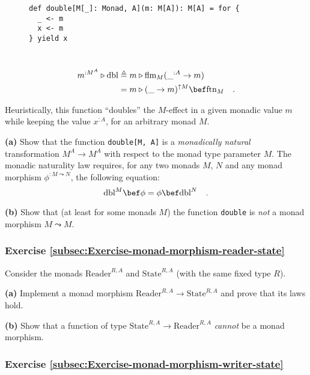 \begin{wrapfigure}{l}{0.52\columnwidth}%
\vspace{-0.7\baselineskip}
\begin{lstlisting}
def double[M[_]: Monad, A](m: M[A]): M[A] = for {
  _ <- m
  x <- m
} yield x
\end{lstlisting}

\vspace{-1.5\baselineskip}
\end{wrapfigure}%

~\vspace{-0.45\baselineskip}
\begin{align*}
m^{:M^{A}}\triangleright\text{dbl} & \triangleq m\triangleright\text{flm}_{M}(\_^{:A}\rightarrow m)\\
 & =m\triangleright(\_\rightarrow m)^{\uparrow M}\bef\text{ftn}_{M}\quad.
\end{align*}

Heuristically, this function \textsf{``}doubles\textsf{''} the $M$-effect in a given
monadic value $m$ while keeping the value $x^{:A}$, for an arbitrary
monad $M$. 

\textbf{(a)} Show that the function \lstinline!double[M, A]! is a
\emph{monadically natural} transformation $M^{A}\rightarrow M^{A}$
with respect to the monad type parameter $M$. The monadic naturality
law requires, for any two monads $M$, $N$ and any monad morphism
$\phi^{:M\leadsto N}$, the following equation:
\[
\text{dbl}^{M}\bef\phi=\phi\bef\text{dbl}^{N}\quad.
\]

\textbf{(b)} Show that (at least for some monads $M$) the function
\lstinline!double! is \emph{not} a monad morphism $M\leadsto M$. 

\subsubsection{Exercise \label{subsec:Exercise-monad-morphism-reader-state}\ref{subsec:Exercise-monad-morphism-reader-state}}

Consider the monads $\text{Reader}^{R,A}$ and $\text{State}^{R,A}$
(with the same fixed type $R$). 

\textbf{(a)} Implement a monad morphism $\text{Reader}^{R,A}\rightarrow\text{State}^{R,A}$
and prove that its laws hold.

\textbf{(b)} Show that a function of type $\text{State}^{R,A}\rightarrow\text{Reader}^{R,A}$
\emph{cannot} be a monad morphism.

\subsubsection{Exercise \label{subsec:Exercise-monad-morphism-writer-state}\ref{subsec:Exercise-monad-morphism-writer-state}}

